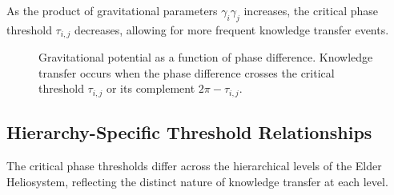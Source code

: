 \begin{corollary}
As the product of gravitational parameters $\gamma_i\gamma_j$ increases, the critical phase threshold $\tau_{i,j}$ decreases, allowing for more frequent knowledge transfer events.
\end{corollary}

\begin{figure}[ht]
\centering
{}
\caption{Gravitational potential as a function of phase difference. Knowledge transfer occurs when the phase difference crosses the critical threshold $\tau_{i,j}$ or its complement $2\pi-\tau_{i,j}$.}
\label{fig:phase_threshold_potential}
\end{figure}

\subsection{Hierarchy-Specific Threshold Relationships}

The critical phase thresholds differ across the hierarchical levels of the Elder Heliosystem, reflecting the distinct nature of knowledge transfer at each level.

